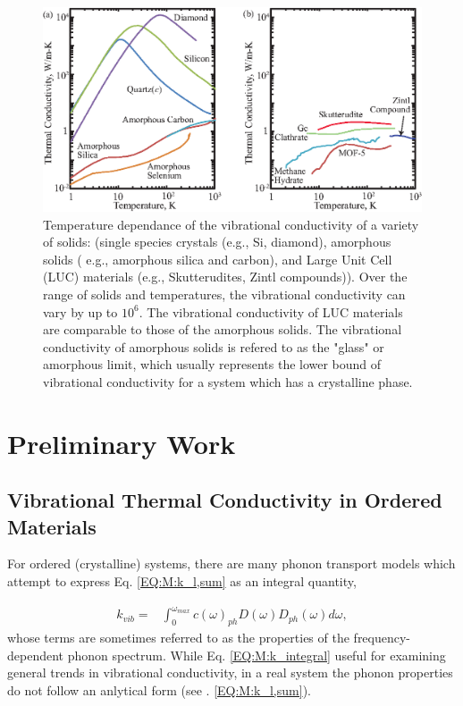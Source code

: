 \documentclass[letterpaper,12pt]{article}
\begin{document}
\begin{figure}
\begin{center}
\includegraphics[scale=1.0]{k.eps}
\vspace*{-5mm}
\end{center}
\caption{\label{FIG:k_thermal_solids}Temperature dependance of the vibrational conductivity of a variety of solids: (single species crystals (e.g., Si, diamond), amorphous solids ( e.g., amorphous silica and carbon), and Large Unit Cell (LUC) materials (e.g., Skutterudites, Zintl compounds)). Over the range of solids and temperatures, the vibrational conductivity can vary by up to $10^6$. The vibrational conductivity of LUC materials are comparable to those of the amorphous solids.  The vibrational conductivity of amorphous solids is refered to as the "glass" or amorphous limit, which usually represents the lower bound of vibrational conductivity for a system which has a crystalline phase.\cite{cahill1987,cahill1992} }
\end{figure}

\clearpage

\section{\label{S-Prelim}Preliminary Work}

\subsection{\label{S-Prelim-Vib-Cond-Ordered}Vibrational Thermal Conductivity in Ordered Materials}

For ordered (crystalline) systems, there are many phonon transport models which attempt to express Eq$.$ \eqref{EQ:M:k_l,sum} as an integral quantity,\cite{callaway1959,holland1963}

\begin{equation}\label{EQ:M:k_integral}
\begin{split}
k_{vib}=& \int_{0}^{\omega_{max}} c(\omega)_{ph} D(\omega) D_{ph}(\omega) d\omega,
\end{split}
\end{equation}
whose terms are sometimes referred to as the properties of the frequency-dependent phonon spectrum. While Eq$.$ \eqref{EQ:M:k_integral}  useful for examining general trends in vibrational conductivity, in a real system the phonon properties do not follow an anlytical form (see $.$ \eqref{EQ:M:k_l,sum}). 
\end{document}
